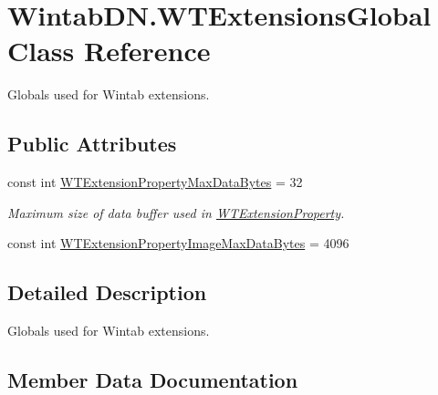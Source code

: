 \hypertarget{class_wintab_d_n_1_1_w_t_extensions_global}{}\section{Wintab\+D\+N.\+W\+T\+Extensions\+Global Class Reference}
\label{class_wintab_d_n_1_1_w_t_extensions_global}


Globals used for Wintab extensions.  


\subsection*{Public Attributes}
\begin{DoxyCompactItemize}
\item 
const int \mbox{\hyperlink{class_wintab_d_n_1_1_w_t_extensions_global_a7d018d3547cfd0f49ee66064ca0bdd36}{W\+T\+Extension\+Property\+Max\+Data\+Bytes}} = 32
\begin{DoxyCompactList}\small\item\em Maximum size of data buffer used in \mbox{\hyperlink{struct_wintab_d_n_1_1_w_t_extension_property}{W\+T\+Extension\+Property}}. \end{DoxyCompactList}\item 
const int \mbox{\hyperlink{class_wintab_d_n_1_1_w_t_extensions_global_aa9e08361c4d806f3184755790407fce4}{W\+T\+Extension\+Property\+Image\+Max\+Data\+Bytes}} = 4096
\end{DoxyCompactItemize}


\subsection{Detailed Description}
Globals used for Wintab extensions. 



\subsection{Member Data Documentation}
\mbox{\label{class_wintab_d_n_1_1_w_t_extensions_global_aa9e08361c4d806f3184755790407fce4}} 
